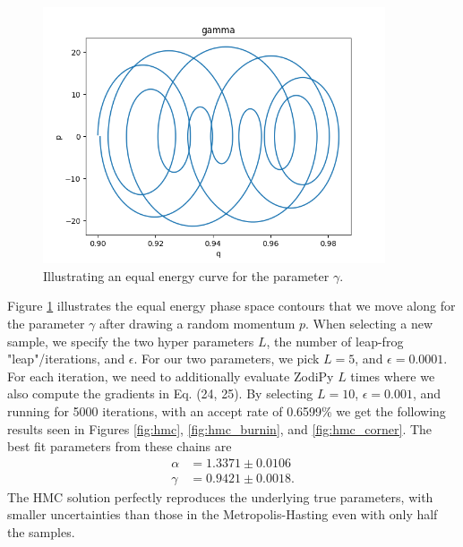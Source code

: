\documentclass{article}
\begin{document}
\begin{figure}
    \centering
    \includegraphics[width=0.9\textwidth]{figs/gamma_curve.png}
    \caption{Illustrating an equal energy curve for the parameter $\gamma$.}
    \label{fig:energy curves}
\end{figure}
Figure \ref{fig:energy curves} illustrates the equal energy phase space contours that we move along for the parameter $\gamma$ after drawing a random momentum $p$.
When selecting a new sample, we specify the two hyper parameters $L$, the number of leap-frog "leap"/iterations, and $\epsilon$. For our two parameters, we pick $L=5$, and $\epsilon=0.0001$. For each iteration, we need to additionally evaluate ZodiPy $L$ times where we also compute the gradients in Eq. (24, 25). By selecting $L=10$, $\epsilon=0.001$, and running for 5000 iterations, with an accept rate of 0.6599\% we get the following results seen in Figures \ref{fig:hmc}, \ref{fig:hmc_burnin}, and \ref{fig:hmc_corner}. The best fit parameters from these chains are
\begin{align*}
    \alpha &= 1.3371 \pm  0.0106\\
    \gamma &= 0.9421 \pm  0.0018.
\end{align*}
The HMC solution perfectly reproduces the underlying true parameters, with smaller uncertainties than those in the Metropolis-Hasting even with only half the samples.
\end{document}
